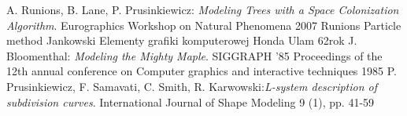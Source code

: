 \documentclass[a4paper,12pt]{report}
\begin{document}








\begin{thebibliography}{1}
 A. Runions, B. Lane, P. Prusinkiewicz: \emph{Modeling Trees with a Space Colonization Algorithm}.
Eurographics Workshop on Natural Phenomena 2007
 Runions Particle method
 Jankowski  Elementy grafiki komputerowej
 Honda
 Ulam 62rok
J. Bloomenthal: \emph{Modeling the Mighty Maple}. SIGGRAPH '85 Proceedings of the 12th annual conference on Computer graphics and interactive techniques 1985
 P. Prusinkiewicz, F. Samavati, C. Smith, R. Karwowski:\emph{L-system description of subdivision curves}. International Journal of Shape Modeling 9 (1), pp. 41-59
\end{thebibliography}
\end{document}
